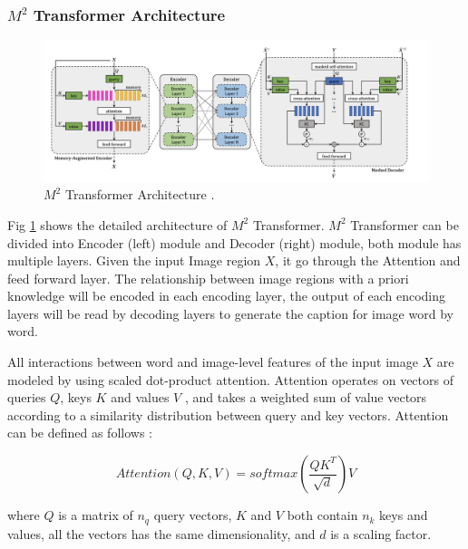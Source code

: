 \documentclass[
]{krantz}
\begin{document}
\hypertarget{m2-transformer-architecture}{%
\subsubsection{\texorpdfstring{\(M^2\) Transformer Architecture}{M\^{}2 Transformer Architecture}}\label{m2-transformer-architecture}}

\begin{figure}

{\centering \includegraphics[width=1\linewidth]{figures/02-01/2.1 m2} 

}

\caption{\(M^2\) Transformer Architecture \citep{cornia2020m2}.}\label{fig:m2arc2}
\end{figure}



Fig \ref{fig:m2arc2} shows the detailed architecture of \(M^2\) Transformer. \(M^2\) Transformer can be divided into Encoder (left) module and Decoder (right) module, both module has multiple layers. Given the input Image region \(X\), it go through the Attention and feed forward layer. The relationship between image regions with a priori knowledge will be encoded in each encoding layer, the output of each encoding layers will be read by decoding layers to generate the caption for image word by word.\citep{cornia2020m2}

All interactions between word and image-level features of the input image \(X\) are modeled by using scaled dot-product attention. Attention operates on vectors of queries \(Q\), keys \(K\) and values \(V\) , and takes a weighted sum of value vectors according to a similarity distribution between query and key vectors.
Attention can be defined as follows \citep{cornia2020m2}:

\begin{equation}
Attention(Q, K, V) = softmax(\frac{QK^T}{\sqrt{d}}) V
\label{eq:binom}
\end{equation}

where \(Q\) is a matrix of \(n_q\) query vectors, \(K\) and \(V\) both contain \(n_k\) keys and values, all the vectors has the same dimensionality, and \(d\) is a scaling factor.
\end{document}
